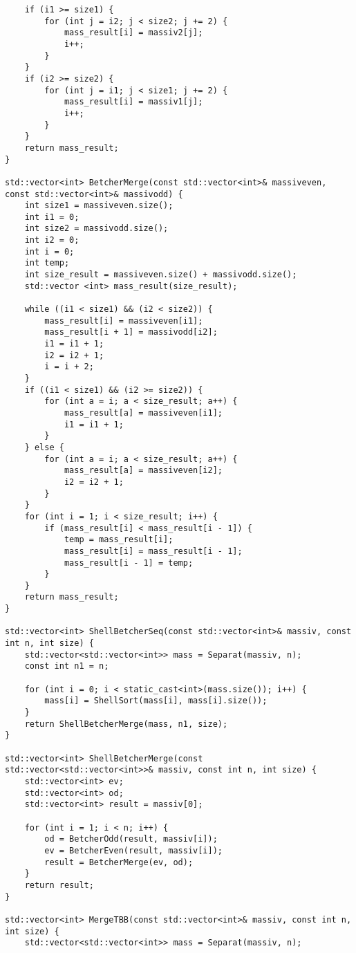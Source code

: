 \documentclass{report}
\begin{document}
\begin{lstlisting}
    if (i1 >= size1) {
        for (int j = i2; j < size2; j += 2) {
            mass_result[i] = massiv2[j];
            i++;
        }
    }
    if (i2 >= size2) {
        for (int j = i1; j < size1; j += 2) {
            mass_result[i] = massiv1[j];
            i++;
        }
    }
    return mass_result;
}

std::vector<int> BetcherMerge(const std::vector<int>& massiveven, const std::vector<int>& massivodd) {
    int size1 = massiveven.size();
    int i1 = 0;
    int size2 = massivodd.size();
    int i2 = 0;
    int i = 0;
    int temp;
    int size_result = massiveven.size() + massivodd.size();
    std::vector <int> mass_result(size_result);

    while ((i1 < size1) && (i2 < size2)) {
        mass_result[i] = massiveven[i1];
        mass_result[i + 1] = massivodd[i2];
        i1 = i1 + 1;
        i2 = i2 + 1;
        i = i + 2;
    }
    if ((i1 < size1) && (i2 >= size2)) {
        for (int a = i; a < size_result; a++) {
            mass_result[a] = massiveven[i1];
            i1 = i1 + 1;
        }
    } else {
        for (int a = i; a < size_result; a++) {
            mass_result[a] = massiveven[i2];
            i2 = i2 + 1;
        }
    }
    for (int i = 1; i < size_result; i++) {
        if (mass_result[i] < mass_result[i - 1]) {
            temp = mass_result[i];
            mass_result[i] = mass_result[i - 1];
            mass_result[i - 1] = temp;
        }
    }
    return mass_result;
}

std::vector<int> ShellBetcherSeq(const std::vector<int>& massiv, const int n, int size) {
    std::vector<std::vector<int>> mass = Separat(massiv, n);
    const int n1 = n;

    for (int i = 0; i < static_cast<int>(mass.size()); i++) {
        mass[i] = ShellSort(mass[i], mass[i].size());
    }
    return ShellBetcherMerge(mass, n1, size);
}

std::vector<int> ShellBetcherMerge(const std::vector<std::vector<int>>& massiv, const int n, int size) {
    std::vector<int> ev;
    std::vector<int> od;
    std::vector<int> result = massiv[0];

    for (int i = 1; i < n; i++) {
        od = BetcherOdd(result, massiv[i]);
        ev = BetcherEven(result, massiv[i]);
        result = BetcherMerge(ev, od);
    }
    return result;
}

std::vector<int> MergeTBB(const std::vector<int>& massiv, const int n, int size) {
    std::vector<std::vector<int>> mass = Separat(massiv, n);


\end{lstlisting}
\end{document}
